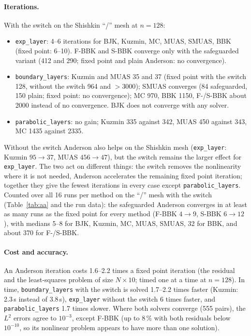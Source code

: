 \documentclass[11pt]{article}
\begin{document}


\paragraph{Iterations.} With the switch on the Shishkin ``/'' mesh at $n=128$:
\begin{itemize}[leftmargin=*]
\item \texttt{exp\_layer}: 4--6 iterations for BJK, Kuzmin, MC, MUAS, SMUAS, BBK (fixed point: 6--10). F-BBK and
  S-BBK converge only with the safeguarded variant (412 and 290; fixed point and plain Anderson: no convergence).
\item \texttt{boundary\_layers}: Kuzmin and MUAS 35 and 37 (fixed point with the switch 128, without the switch 964
  and $>3000$); SMUAS converges (84 safeguarded, 150 plain; fixed point: no convergence); MC 970, BBK 1150, F-/S-BBK
  about 2000 instead of no convergence. BJK does not converge with any solver.
\item \texttt{parabolic\_layers}: no gain; Kuzmin 335 against 342, MUAS 450 against 343, MC 1435 against 2335.
\end{itemize}
Without the switch Anderson also helps on the Shishkin mesh (\texttt{exp\_layer}: Kuzmin $95\to37$, MUAS $456\to47$),
but the switch remains the larger effect for \texttt{exp\_layer}. The two act on different things: the switch removes
the nonlinearity where it is not needed, Anderson accelerates the remaining fixed point iteration; together they give
the fewest iterations in every case except \texttt{parabolic\_layers}. Counted over all 16 runs per method on the
``/'' mesh with the switch (Table~\ref{tab:aa} and the run data): the safeguarded Anderson converges in at least as
many runs as the fixed point for every method (F-BBK $4\to9$, S-BBK $6\to12$), with medians 5--8 for BJK, Kuzmin, MC, MUAS, SMUAS, 32
for BBK, and about 370 for F-/S-BBK.

\paragraph{Cost and accuracy.} An Anderson iteration costs 1.6--2.2 times a fixed point iteration (the residual and
the least-squares problem of size $N\times10$; timed one at a time at $n=128$). In time, \texttt{boundary\_layers}
with the switch is solved 1.7--2.2 times faster (Kuzmin: 2.3\,s instead of 3.8\,s),
\texttt{exp\_layer} without
the switch 6 times faster, and \texttt{parabolic\_layers} 1.7 times slower. Where both solvers converge (555 pairs), the $L^2$ errors
agree to $10^{-3}$, except F-BBK (up to 8\,\% with both residuals below $10^{-10}$, so its nonlinear problem appears to
have more than one solution).
\end{document}
